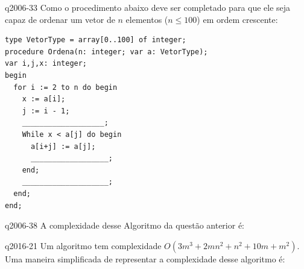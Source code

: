 \documentclass[10pt,a4paper]{article}
\begin{document}
{
\def\AMCbeginQuestion#1#2{\par\noindent{\bf (POSCOMP 2006 - Questão 33)}}
\begin{question}{q2006-33} Como o procedimento abaixo deve ser completado para que ele seja capaz de ordenar um vetor de $n$ elementos ($n \le 100$) em ordem crescente:
\begin{lstlisting}
type VetorType = array[0..100] of integer;
procedure Ordena(n: integer; var a: VetorType);
var i,j,x: integer;
begin
  for i := 2 to n do begin
    x := a[i];
    j := i - 1;
    ___________________;
    While x < a[j] do begin
      a[i+j] := a[j];
      __________________;
    end;
    ____________________;
  end;
end;
\end{lstlisting}
\begin{choices}
\end{choices}
\end{question}
}

{
\def\AMCbeginQuestion#1#2{\par\noindent{\bf (POSCOMP 2006 - Questão 38)}}
\begin{question}{q2006-38} A complexidade desse Algoritmo da questão anterior é:
\begin{choices}
\end{choices}
\end{question}
}

{
\def\AMCbeginQuestion#1#2{\par\noindent{\bf (POSCOMP 2016 - Questão 21)}}
\begin{question}{q2016-21} Um algoritmo tem complexidade $O(3m^3 + 2mn^2 + n^2 + 10m + m^2)$. Uma maneira simplificada de representar a complexidade desse algoritmo é:
\begin{choices}
\end{choices}
\end{question}
}
\end{document}
